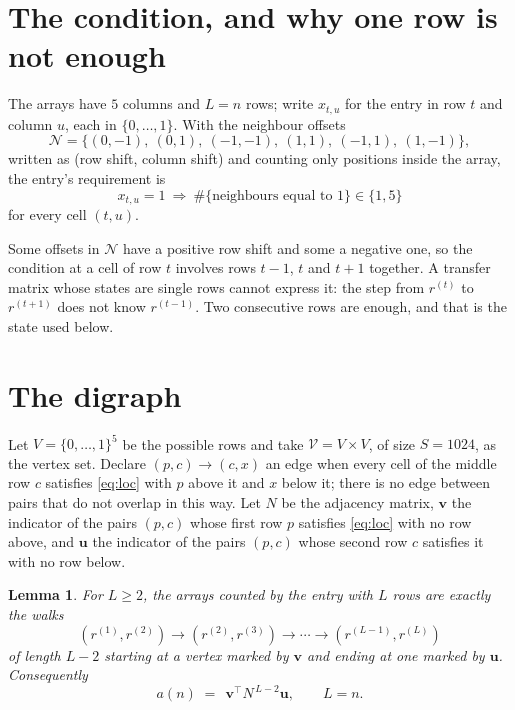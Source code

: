 \documentclass[11pt,a4paper]{article}
\theoremstyle{plain}
\newtheorem{lemma}[theorem]{Lemma}
\theoremstyle{definition}
\begin{document}
\section{The condition, and why one row is not enough}

The arrays have $5$ columns and $L=n$ rows; write $x_{t,u}$ for the entry in
row $t$ and column $u$, each in $\{0,\dots,1\}$. With the neighbour offsets
\[
\mathcal N=\{(0,-1),\ (0,1),\ (-1,-1),\ (1,1),\ (-1,1),\ (1,-1)\},
\]
written as (row shift, column shift) and counting only positions inside the array, the
entry's requirement is
\begin{equation}\label{eq:loc}
x_{t,u}=1\ \Rightarrow\ \#\{\text{neighbours equal to }1\}\in\{1,5\}
\end{equation}
for every cell $(t,u)$.

Some offsets in $\mathcal N$ have a positive row shift and some a negative one, so the
condition at a cell of row $t$ involves rows $t-1$, $t$ and $t+1$ together. A transfer
matrix whose states are single rows cannot express it: the step from $r^{(t)}$ to
$r^{(t+1)}$ does not know $r^{(t-1)}$. Two consecutive rows are enough, and that is
the state used below.

\section{The digraph}

Let $V=\{0,\dots,1\}^{5}$ be the possible rows and take
$\mathcal V=V\times V$, of size $S=1024$, as the vertex set. Declare $(p,c)\to(c,x)$ an edge
when every cell of the middle row $c$ satisfies \eqref{eq:loc} with $p$ above it and $x$
below it; there is no edge between pairs that do not overlap in this way. Let $N$ be the
adjacency matrix, $\mathbf{v}$ the indicator of the pairs $(p,c)$ whose first row $p$
satisfies \eqref{eq:loc} with no row above, and $\mathbf{u}$ the indicator of
the pairs $(p,c)$ whose second row $c$ satisfies it with no row below.

\begin{lemma}\label{lem:walk}
For $L\ge2$, the arrays counted by the entry with $L$ rows are exactly the walks
\[
(r^{(1)},r^{(2)})\to(r^{(2)},r^{(3)})\to\cdots\to(r^{(L-1)},r^{(L)})
\]
of length $L-2$ starting at a vertex marked by $\mathbf{v}$ and ending at one marked by
$\mathbf{u}$. Consequently
\[
a(n)\;=\;\,\mathbf{v}^{\!\top}N^{\,L-2}\mathbf{u},\qquad L=n .
\]
\end{lemma}
\end{document}
